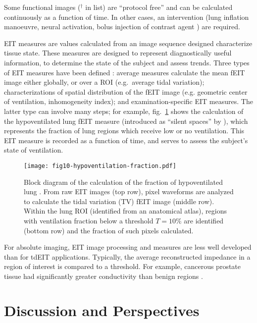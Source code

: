 \documentclass[10pt,journal]{IEEEtran}\def\TBLWIDA{15mm}\def\TBLWIDB{60mm}
\newcommand\fref[1]{fig.\ \ref{#1}}
\begin{document}
Some functional images ($^\dagger$ in list) are ``protocol free'' and can be
calculated continuously as a function of time. In other cases, an intervention
(lung inflation manoeuvre, neural activation, bolus injection of contrast
agent \cite{Frerichs2002Perfusion}) are required.


EIT measures are values calculated from an image sequence designed
characterize tissue state. These measures are designed to represent
diagnostically useful information, to determine the state of the subject
and assess trends.
 Three types of EIT measures
have been defined \cite{Frerichs2017Chest}: 
average measures calculate the mean fEIT image
either globally, or over a ROI \cite{Ferrario2012morphological}
(e.g.\ average tidal variation);
characterizations of spatial distribution of the fEIT image
(e.g. geometric center of ventilation, inhomogeneity index);
and examination-specific EIT measures.
The latter type can involve many steps; for example, 
\fref{fig:fEIT_eg_silent_spaces} shows the
calculation of the hypoventilated lung fEIT measure 
(introduced as ``silent spaces'' by \cite{Waldmann2015Silent}),
which represents the fraction of lung regions which receive
low or no ventilation. This EIT measure is recorded as a function of time, and
serves to assess the subject's state of ventilation.

\begin{figure} \centering
   \texttt{[image: fig10-hypoventilation-fraction.pdf]}
\caption{%
Block diagram of the calculation of the
fraction of hypoventilated lung \cite{Waldmann2015Silent}.
From raw EIT images (top row), pixel waveforms are analyzed
to calculate the tidal variation (TV) fEIT image (middle row).
Within the lung ROI (identified from an anatomical atlas),
regions with ventilation fraction below a threshold $T=10\%$
are identified (bottom row) and the fraction of such pixels calculated.
}
\label{fig:fEIT_eg_silent_spaces}
\end{figure}

For absolute imaging, EIT image processing and measures are less
well developed than for tdEIT applications. Typically, the
average reconstructed impedance in a region of interest
is compared to a threshold. For example, cancerous prostate
tissue had significantly greater conductivity than benign
regions \cite{Wan2013Transrectal}.


\section{Discussion and Perspectives}
\end{document}
